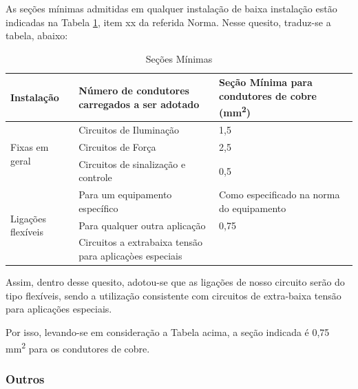As seções mínimas admitidas em qualquer instalação de baixa instalação estão indicadas na Tabela \ref{secoes-minimas}, item xx da referida Norma. Nesse quesito, traduz-se a tabela, abaixo:

\begin{table}[h]
\begin{tabular}{ |l | p{7cm} | p{5cm} |}
\hline
Instalação                          & Número de condutores carregados a ser adotado           & Seção Mínima para condutores de cobre (mm\textsuperscript{2}) \\ \hline
\multirow{3}{*}{Fixas em geral}     & Circuitos de Iluminação                                 & 1,5                                        \\ \cline{2-3}
                                    & Circuitos de Força                                      & 2,5                                        \\ \cline{2-3}
                                    & Circuitos de sinalização e controle                     & 0,5                                        \\ \hline
\multirow{3}{*}{Ligações flexíveis} & Para um equipamento específico                          & Como especificado na norma do equipamento  \\ \cline{2-3}
                                    & Para qualquer outra aplicação                           & 0,75                                       \\ \cline{2-3} 
                                    & Circuitos a extrabaixa tensão para aplicaçòes especiais &                                           
\\ \hline

\end{tabular}
\label{secoes-minimas}
\caption{Seções Mínimas}
\end{table}

Assim, dentro desse quesito, adotou-se que as ligações de nosso circuito serão do tipo flexíveis, sendo a utilização consistente com circuitos de extra-baixa tensão para aplicações especiais. 

Por isso, levando-se em consideração a Tabela acima, a seção indicada é 0,75 mm\textsuperscript{2} para os condutores de cobre.

\subsubsection{Outros}

